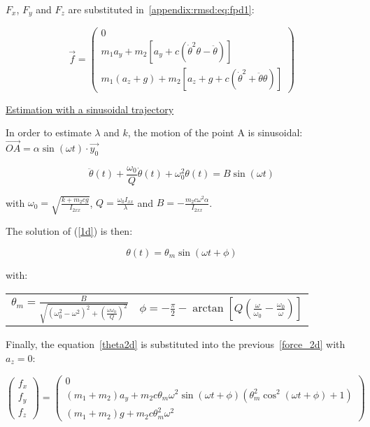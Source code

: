 \documentclass[\main/main.tex]{subfiles}
\begin{document}
$F_x$, $F_y$ and $F_z$ are substituted in~\eqref{appendix:rmsd:eq:fpd1}:

\begin{equation}
  \label{force_2d}
  \overrightarrow{f}
  =
  \begin{pmatrix}
  0 \\
  m_1 a_y + m_2 [a_y + c (\dot{\theta}^2 \theta - \ddot{\theta})] \\
  m_1 (a_z + g) + m_2 [a_z + g + c (\dot{\theta}^2 + \ddot{\theta} \theta)]
  \end{pmatrix}
\end{equation}

\underline{Estimation with a sinusoidal trajectory}

In order to estimate $\lambda$ and $k$, the motion of the point A is sinusoidal: $\overrightarrow{OA} = \alpha \sin(\omega t) \cdot \overrightarrow{y_0}$

\begin{equation}
 \label{1d}
 \ddot{\theta}(t) + \frac{\omega_0}{Q} \dot{\theta}(t) + \omega_0^2 \theta(t) = B \sin(\omega t)
\end{equation}

with $\omega_0 = \sqrt{\frac{k + m_2 c g}{I_{2xx}}}$, $Q = \frac{\omega_0 I_{xx}}{\lambda}$ and $B = -\frac{m_2 c \omega^2 \alpha}{I_{2xx}}$.

The solution of (\ref{1d}) is then:


\begin{equation}
  \label{theta2d}
  \theta(t) = \theta_m \sin(\omega t + \phi)
\end{equation}


with:
{\centering
 \begin{tabular}{cc}
  $\theta_m = \frac{B}{\sqrt{{(\omega_0^2 - \omega^2)}^2 + {\left( \frac{\omega \omega_0}{Q}\right)}^2}}$
    & $\phi = - \frac{\pi}{2} - \arctan \left[ Q \left( \frac{\omega}{\omega_0} - \frac{\omega_0}{\omega} \right) \right] $ \\
 \end{tabular}
 \par}

\vspace{0.5cm}

Finally, the equation~\eqref{theta2d} is substituted into the previous~\eqref{force_2d} with $a_z = 0$:

\begin{equation*}
  \begin{pmatrix}
  f_x \\
  f_y \\
  f_z
  \end{pmatrix}
  =
  \begin{pmatrix}
  0 \\
  (m_1 + m_2) a_y + m_2 c \theta_m \omega^2 \sin(\omega t + \phi) (\theta_m^2 \cos^2(\omega t + \phi) + 1)  \\
  (m_1 + m_2) g + m_2 c \theta_m^2 \omega^2
  \end{pmatrix}
\end{equation*}
\end{document}
